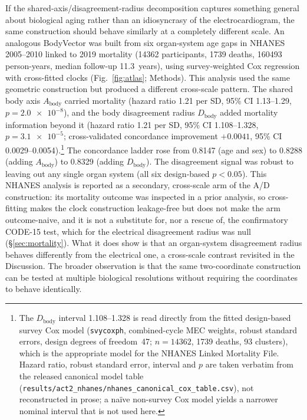 \documentclass[11pt]{article}
\newcommand{\D}{\ensuremath{D}}
\newcommand{\A}{\ensuremath{A}}
\begin{document}
If the shared-axis/disagreement-radius decomposition captures something general about
biological aging rather than an idiosyncrasy of the electrocardiogram, the same
construction should behave similarly at a completely different scale. An
analogous BodyVector was built from six organ-system age gaps in NHANES 2005--2010 linked to
2019 mortality (\num{14362} participants, \num{1739} deaths, \num{160493}
person-years, median follow-up \num{11.3}~years), using survey-weighted Cox regression
with cross-fitted clocks (Fig.~\ref{fig:atlas}; Methods). This analysis used the same
geometric construction but produced a different cross-scale pattern. The shared body axis
$\A_{\text{body}}$ carried mortality
(hazard ratio \num{1.21} per SD, 95\% CI \numrange{1.13}{1.29}, $p=\num{2.0e-8}$), and
the body disagreement radius $\D_{\text{body}}$ added mortality information beyond it
(hazard ratio \num{1.21} per SD, 95\% CI \numrange{1.108}{1.328}, $p=\num{3.1e-5}$;
cross-validated concordance improvement $+\num{0.0041}$, 95\% CI
\numrange{0.0029}{0.0054}).\footnote{The $\D_{\text{body}}$ interval
\numrange{1.108}{1.328} is read directly from the fitted design-based survey Cox
model (\texttt{svycoxph}, combined-cycle MEC weights, robust standard errors, design
degrees of freedom~47; $n=\num{14362}$, \num{1739} deaths, \num{93} clusters), which
is the appropriate model for the NHANES Linked Mortality File. Hazard ratio, robust
standard error, interval and $p$ are taken verbatim from the released canonical model
table (\texttt{results/act2\_nhanes/nhanes\_canonical\_cox\_table.csv}), not reconstructed
in prose; a naïve non-survey Cox model yields a narrower nominal interval that is not
used here.} The concordance ladder rose from \num{0.8147} (age and
sex) to \num{0.8288} (adding $\A_{\text{body}}$) to \num{0.8329} (adding
$\D_{\text{body}}$). The disagreement signal was robust to leaving out any single
organ system (all six design-based $p<\num{0.05}$). This NHANES analysis is reported as
a secondary, cross-scale arm of the A/D construction: its mortality
outcome was inspected in a prior analysis, so cross-fitting makes the clock
construction leakage-free but does not make the arm outcome-naive, and it is not a
substitute for, nor a rescue of, the confirmatory CODE-15 test, which for the
electrical disagreement radius was null (\S\ref{sec:mortality}). What it does show is
that an organ-system disagreement radius behaves differently from the electrical one,
a cross-scale contrast revisited in the Discussion. The broader observation is that the
same two-coordinate construction can be tested at multiple biological resolutions without
requiring the coordinates to behave identically.
\end{document}
